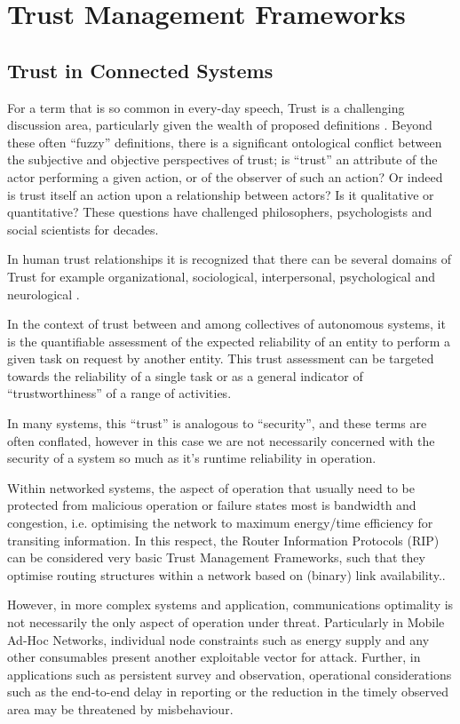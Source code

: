 \documentclass{aamas2016}
\begin{document}
\section{Trust Management Frameworks}

\subsection{Trust in Connected Systems}

For a term that is so common in every-day speech, Trust is a challenging discussion area, particularly given the wealth of proposed definitions \cite{Lee2004}. Beyond these often ``fuzzy'' definitions, there is a significant ontological conflict between the subjective and objective perspectives of trust; is ``trust'' an attribute of the actor performing a given action, or of the observer of such an action? Or indeed is trust itself an action upon a relationship between actors? Is it qualitative or quantitative? These questions have challenged philosophers, psychologists and social scientists for decades.

In human trust relationships it is recognized that there can be several domains of Trust for example organizational, sociological, interpersonal, psychological and neurological \cite{Lee2004}.

In the context of trust between and among collectives of autonomous systems, it is the quantifiable assessment of the expected reliability of an entity to perform a given task on request by another entity. This trust assessment can be targeted towards the reliability of a single task or as a general indicator of ``trustworthiness'' of a range of activities.

In many systems, this ``trust'' is analogous to ``security'', and these terms are often conflated, however in this case we are not necessarily concerned with the security of a system so much as it's runtime reliability in operation.

Within networked systems, the aspect of operation that usually need to be protected from malicious operation or failure states most is bandwidth and congestion, i.e. optimising the network to maximum energy/time efficiency for transiting information.
In this respect, the Router Information Protocols (RIP) can be considered very basic Trust Management Frameworks, such that they optimise routing structures within a network based on (binary) link availability.\cite{RFC2453}.

However, in more complex systems and application, communications optimality is not necessarily the only aspect of operation under threat.
Particularly in Mobile Ad-Hoc Networks, individual node constraints such as energy supply and any other consumables present another exploitable vector for attack.
Further, in applications such as persistent survey and observation, operational considerations such as the end-to-end delay in reporting or the reduction in the timely observed area may be threatened by misbehaviour.
\end{document}
